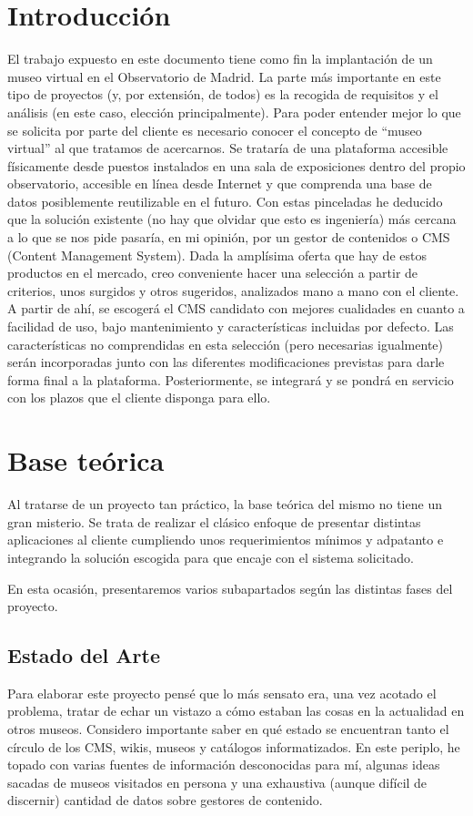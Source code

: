 \section{Introducción}
El trabajo expuesto en este documento tiene como fin la implantación de un museo virtual en el Observatorio de Madrid. La parte más importante en este tipo de proyectos (y, por extensión, de todos) es la recogida de requisitos y el análisis (en este caso, elección principalmente).
Para poder entender mejor lo que se solicita por parte del cliente es necesario conocer el concepto de ``museo virtual'' al que tratamos de acercarnos. Se trataría de una plataforma accesible físicamente desde puestos instalados en una sala de exposiciones dentro del propio observatorio, accesible en línea desde Internet y que comprenda una base de datos posiblemente reutilizable en el futuro. Con estas pinceladas he deducido que la solución existente (no hay que olvidar que esto es ingeniería) más cercana a lo que se nos pide pasaría, en mi opinión, por un gestor de contenidos o CMS (Content Management System).
Dada la amplísima oferta que hay de estos productos en el mercado, creo conveniente hacer una selección a partir de criterios, unos surgidos y otros sugeridos, analizados mano a mano con el cliente.
A partir de ahí, se escogerá el CMS candidato con mejores cualidades en cuanto a facilidad de uso, bajo mantenimiento y características incluidas por defecto. Las características no comprendidas en esta selección (pero necesarias igualmente) serán incorporadas junto con las diferentes modificaciones previstas para darle forma final a la plataforma. Posteriormente, se integrará y se pondrá en servicio con los plazos que el cliente disponga para ello.

\section{Base teórica}
Al tratarse de un proyecto tan práctico, la base teórica del mismo no tiene un gran misterio. Se trata de realizar el clásico enfoque de presentar distintas aplicaciones al cliente cumpliendo unos requerimientos mínimos y adpatanto e integrando la solución escogida para que encaje con el sistema solicitado.

En esta ocasión, presentaremos varios subapartados según las distintas fases del proyecto.

\subsection{Estado del Arte}
\par Para elaborar este proyecto pensé que lo más sensato era, una vez acotado el problema, tratar de echar un vistazo a cómo estaban las cosas en la actualidad en otros museos. Considero importante saber en qué estado se encuentran tanto el círculo de los CMS, wikis, museos y catálogos informatizados.
En este periplo, he topado con varias fuentes de información desconocidas para mí, algunas ideas sacadas de museos visitados en persona y una exhaustiva (aunque difícil de discernir) cantidad de datos sobre gestores de contenido.

